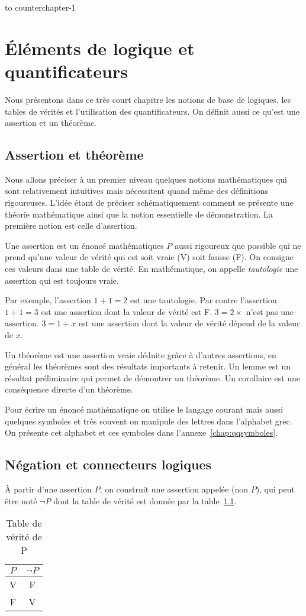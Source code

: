 \add to counter{chapter}{-1}
\chapter{Éléments de logique et quantificateurs}
\minitoc
\minilof
\minilot

Nous présentons dans ce très court chapitre les notions de base de logiques, les
tables de vérités et l'utilisation des quantificateurs. On définit aussi ce
qu'est une assertion et un théorème.
\section{Assertion et théorème}
\label{chap0sec:assertionettheoremes}
Nous allons préciser à un premier niveau quelques notions mathématiques qui sont
relativement intuitives mais nécessitent quand même des définitions rigoureuses.
L’idée étant de préciser schématiquement comment se présente une théorie
mathématique ainsi que la notion essentielle de démonstration. La première
notion est celle d’assertion.

Une assertion est un énoncé mathématiques \(P\) aussi rigoureux que possible qui
ne prend qu'une valeur de vérité qui est soit vraie (V) soit fausse (F). On
consigne ces valeurs dans une table de vérité. En mathématique, on appelle
\emph{tautologie} une assertion qui est toujours vraie.

Par exemple, l'assertion \(1+1=2\) est une tautologie. Par contre l'assertion
\(1+1=3\) est une assertion dont la valeur de vérité est F. \(3=2 \times\) n'est
pas une assertion. \(3=1+x\) est une assertion dont la valeur de vérité dépend
de la valeur de \(x\).

Un théorème est une assertion vraie déduite grâce à d'autres assertions, en
général les théorèmes sont des résultats importants à retenir. Un lemme est un
résultat préliminaire qui permet de démontrer un théorème. Un corollaire est une
conséquence directe d'un théorème.

Pour écrire un énoncé mathématique on utilise le langage courant mais aussi
quelques symboles et très souvent on manipule des lettres dans l'alphabet grec.
On présente cet alphabet et ces symboles dans l'annexe~\ref{chap:qqsymboles}.

\section{Négation et connecteurs logiques}
\label{chap0sec:negationetconnecteurs}
À partir d'une assertion \(P\), on construit une assertion appelée (non \(P\)),
qui peut être noté \(\neg P\) dont la table de vérité est donnée par la
table~\ref{tab:tabveriteP}.
\begin{table}[!h]
    \centering
    \begin{tabular}{|c|c|}\hline
        \(P\) & \(\neg P\) \\ \hline
        V & F \\ F & V \\ \hline
    \end{tabular}
    \caption{Table de vérité de P}
    \label{tab:tabveriteP}
\end{table}

